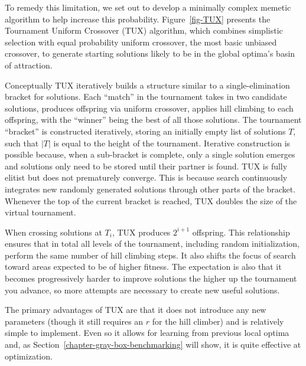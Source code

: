 To remedy this limitation, we set out to develop a minimally complex memetic
algorithm to help increase this probability. Figure~\ref{fig-TUX} presents
the Tournament Uniform Crossover (TUX) algorithm, which combines simplistic
selection with equal probability uniform crossover, the most basic unbiased crossover, to generate starting
solutions likely to be in the global optima's basin of attraction.

Conceptually TUX iteratively builds a structure similar to a single-elimination
bracket for solutions. Each ``match'' in the tournament takes in two candidate solutions,
produces offspring via uniform crossover, applies hill climbing to each offspring, with
the ``winner'' being the best of all those solutions. The tournament ``bracket'' is constructed
iteratively, storing an initially empty list of solutions $T$, such that $|T|$ is equal to the height
of the tournament. Iterative construction is possible because,
when a sub-bracket is complete,
only a single solution
emerges and solutions only need to be stored until their partner is found.
TUX is fully elitist but does not prematurely converge. This is because search continuously
integrates new randomly generated solutions through other parts of the bracket. Whenever the
top of the current bracket is reached, TUX doubles the size of the virtual tournament.

When crossing solutions at $T_i$, TUX produces $2^{i+1}$ offspring. This relationship
ensures that in total all levels of the tournament, including random initialization,
perform the same number of hill climbing steps. It also shifts the focus of search toward
areas expected to be of higher fitness. The expectation is also that it becomes progressively
harder to improve solutions the higher up the tournament you advance, so more attempts
are necessary to create new useful solutions.

The primary advantages of TUX are that it does not introduce any new parameters (though it still
requires an $r$ for the hill climber) and is relatively simple to implement. Even so
it allows for learning from previous local optima and,
as Section~\ref{chapter-gray-box-benchmarking} will show,
it is quite effective at optimization.
